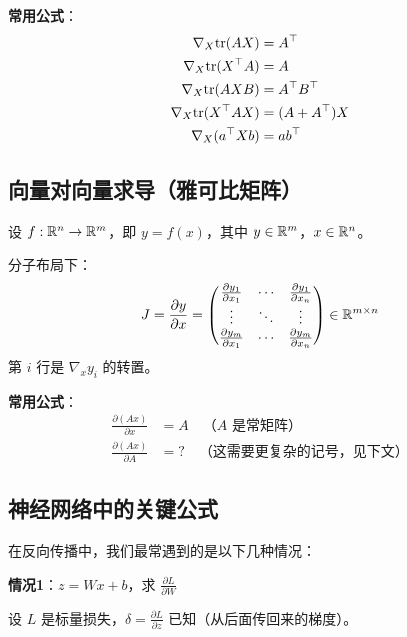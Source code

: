 \textbf{常用公式}：
\begin{align}
\nabla_X \text{tr}(AX) &= A^\top \\
\nabla_X \text{tr}(X^\top A) &= A \\
\nabla_X \text{tr}(AXB) &= A^\top B^\top \\
\nabla_X \text{tr}(X^\top AX) &= (A + A^\top)X \\
\nabla_X (a^\top X b) &= ab^\top
\end{align}


\subsection*{向量对向量求导（雅可比矩阵）}

设 $f: \mathbb{R}^n \to \mathbb{R}^m$，即 $y = f(x)$，其中 $y \in \mathbb{R}^m$，$x \in \mathbb{R}^n$。

\begin{keyformula}[title=雅可比矩阵]
分子布局下：
\begin{equation}
J = \frac{\partial y}{\partial x} = \begin{pmatrix}
\frac{\partial y_1}{\partial x_1} & \cdots & \frac{\partial y_1}{\partial x_n} \\
\vdots & \ddots & \vdots \\
\frac{\partial y_m}{\partial x_1} & \cdots & \frac{\partial y_m}{\partial x_n}
\end{pmatrix} \in \mathbb{R}^{m \times n}
\end{equation}
第 $i$ 行是 $\nabla_{x} y_i$ 的转置。
\end{keyformula}

\textbf{常用公式}：
\begin{align}
\frac{\partial (Ax)}{\partial x} &= A \quad \text{（$A$ 是常矩阵）} \\
\frac{\partial (Ax)}{\partial A} &= ? \quad \text{（这需要更复杂的记号，见下文）}
\end{align}

\subsection*{神经网络中的关键公式}

在反向传播中，我们最常遇到的是以下几种情况：

\textbf{情况1}：$z = Wx + b$，求 $\frac{\partial L}{\partial W}$

设 $L$ 是标量损失，$\delta = \frac{\partial L}{\partial z}$ 已知（从后面传回来的梯度）。

